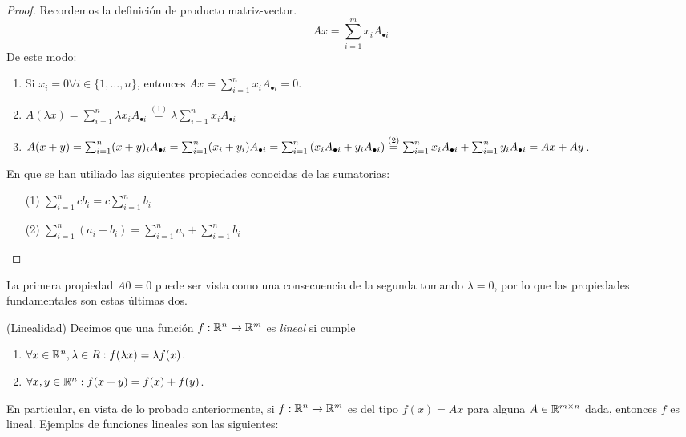 \begin{proof}
    Recordemos la definición de producto matriz-vector.
    \[Ax = \sum_{i = 1}^m x_i A_{\bullet i}\]
    De este modo:
    \begin{enumerate}
        \item Si $x_i = 0 \forall i \in \{1, \dots, n\}$, entonces $Ax = \sum_{i=1}^n x_i A_{\bullet i} = 0$.
        \item $A(\lambda x) = \sum_{i=1}^n \lambda x_i A_{\bullet i} \overset{(1)}{=} \lambda \sum_{i=1}^n x_i A_{\bullet i}$
        \item $A(x + y) = \sum_{i=1}^n (x+y)_i A_{\bullet i} = \sum_{i=1}^n (x_i + y_i)A_{\bullet i} = \sum_{i=1}^n \qty(x_i A_{\bullet i} + y_i A_{\bullet i}) \overset{(2)}{=} \sum_{i=1}^n x_i A_{\bullet i} + \sum_{i=1}^n y_i A_{\bullet i} = Ax + Ay$.
    \end{enumerate}
    En que se han utiliado las siguientes propiedades conocidas de las sumatorias:
    \begin{enumerate}
        \item[(1)] $\sum_{i=1}^n c b_i = c\sum_{i=1}^n b_i$
        \item[(2)] $\sum_{i=1}^n (a_i + b_i) = \sum_{i=1}^n a_i + \sum_{i=1}^n b_i$
    \end{enumerate}
\end{proof}

\begin{remark}
    La primera propiedad $A0 = 0$ puede ser vista como una consecuencia de la segunda tomando $\lambda = 0$, por lo que las propiedades fundamentales son estas últimas dos.
\end{remark}

\begin{definition}(Linealidad)
    Decimos que una función $f: \mathbb{R}^n \to \mathbb{R}^m$ es \textit{lineal} si cumple
    \begin{enumerate}
        \item $\forall x \in \mathbb{R}^n, \lambda \in R : f(\lambda x) = \lambda f(x)$.
        \item $\forall x, y \in \mathbb{R}^n : f(x + y) = f(x) + f(y)$.
    \end{enumerate}
\end{definition}

En particular, en vista de lo probado anteriormente, si $f: \mathbb{R}^n \to \mathbb{R}^m$ es del tipo $f(x) = Ax$ para alguna $A \in \mathbb{R}^{m \times n}$ dada, entonces $f$ es lineal. Ejemplos de funciones lineales son las siguientes:

